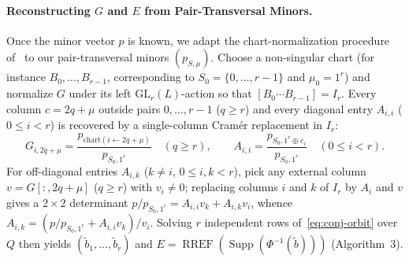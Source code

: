 \documentclass[11pt,a4paper]{article}
\theoremstyle{definition}
\theoremstyle{remark}
\newcommand{\GL}{\mathrm{GL}}
\newcommand{\Supp}{\operatorname{Supp}}
\newcommand{\RREF}{\operatorname{RREF}}
\begin{document}
\paragraph{Reconstructing $G$ and $E$ from Pair-Transversal Minors.}
Once the minor vector $p$ is known, we adapt the chart-normalization procedure of~\cite{BBC+20,BBGT23} to our pair-transversal minors $(p_{S,\mu})$. Choose a non-singular chart (for instance $B_0, \dots, B_{r-1}$, corresponding to $S_0 = \{0, \dots, r-1\}$ and $\mu_0 = 1^r$) and normalize $G$ under its left $\GL_r(L)$-action so that $[B_0 \cdots B_{r-1}] = I_r$. Every column $c = 2q + \mu$ outside pairs $0, \dots, r-1$ ($q \ge r$) and every diagonal entry $A_{i,i}$ ($0 \le i < r$) is recovered by a single-column Cram\'{e}r replacement in $I_r$:
\[
    G_{i, 2q+\mu} = \frac{p_{\text{chart}(i \leftarrow 2q+\mu)}}{p_{S_0, 1^r}} \quad (q \ge r), \qquad
    A_{i, i} = \frac{p_{S_0, 1^r \oplus e_i}}{p_{S_0, 1^r}} \quad (0 \le i < r).
\]
For off-diagonal entries $A_{i, k}$ ($k \neq i$, $0 \le i, k < r$), pick any external column $v = G[:, 2q+\mu]$ ($q \ge r$) with $v_i \neq 0$; replacing columns $i$ and $k$ of $I_r$ by $A_i$ and $v$ gives a $2 \times 2$ determinant $p / p_{S_0, 1^r} = A_{i,i} v_k + A_{i,k} v_i$, whence $A_{i,k} = (p / p_{S_0, 1^r} + A_{i,i} v_k) / v_i$. Solving $r$ independent rows of~\eqref{eq:conj-orbit} over $Q$ then yields $(\tilde{b}_1, \dots, \tilde{b}_r)$ and $E = \RREF(\Supp(\Phi^{-1}(\tilde{b})))$ (Algorithm~3).
\end{document}
